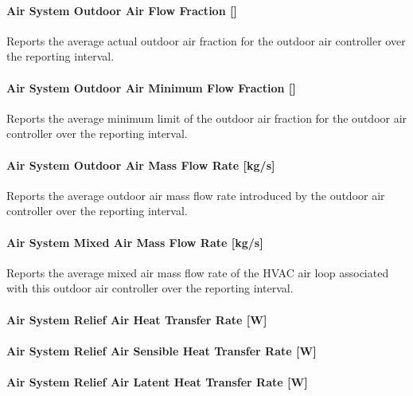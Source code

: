 \paragraph{Air System Outdoor Air Flow Fraction {[]}}\label{air-system-outdoor-air-flow-fraction}

Reports the average actual outdoor air fraction for the outdoor air controller over the reporting interval.

\paragraph{Air System Outdoor Air Minimum Flow Fraction {[]}}\label{air-system-outdoor-air-minimum-flow-fraction}

Reports the average minimum limit of the outdoor air fraction for the outdoor air controller over the reporting interval.

\paragraph{Air System Outdoor Air Mass Flow Rate {[}kg/s{]}}\label{air-system-outdoor-air-mass-flow-rate-kgs}

Reports the average outdoor air mass flow rate introduced by the outdoor air controller over the reporting interval.

\paragraph{Air System Mixed Air Mass Flow Rate {[}kg/s{]}}\label{air-system-mixed-air-mass-flow-rate-kgs}

Reports the average mixed air mass flow rate of the HVAC air loop associated with this outdoor air controller over the reporting interval.

\paragraph{Air System Relief Air Heat Transfer Rate {[}W{]}}\label{air-system-relief-air-heat-transfer-rate-w}

\paragraph{Air System Relief Air Sensible Heat Transfer Rate {[}W{]}}\label{air-system-relief-air-sensible-heat-transfer-rate-w}

\paragraph{Air System Relief Air Latent Heat Transfer Rate {[}W{]}}\label{air-system-relief-air-latent-heat-transfer-rate-w}

